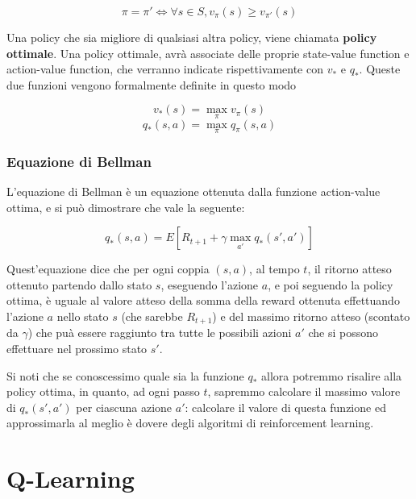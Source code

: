 \documentclass[a4paper,11pt,twoside]{report} %
\begin{document}
\begin{equation}
\pi = \pi ' \iff  \forall s \in S, v_{\pi}(s) \ge v_{\pi '}(s)
\end{equation}

Una policy che sia migliore di qualsiasi altra policy, viene chiamata \textbf{policy ottimale}. Una policy ottimale, avrà associate delle proprie state-value function e action-value function, che verranno indicate rispettivamente con $v_{*}$ e $q_{*}$. Queste due funzioni vengono formalmente definite in questo modo

\begin{equation}
	v_{*}(s) = \max_{\pi} v_{\pi}(s)
\end{equation}
\begin{equation}
q_{*}(s,a) = \max_{\pi} q_{\pi}(s,a)
\end{equation}

\subsection{Equazione di Bellman}

L'equazione di Bellman è un equazione ottenuta dalla funzione action-value ottima, e si può dimostrare che vale la seguente:

\begin{equation}
	q_{*}(s,a)=E[R_{t+1}+\gamma \max_{a'}q_{*}(s',a')]
\end{equation}

Quest'equazione dice che per ogni coppia $(s,a)$, al tempo $t$, il ritorno atteso ottenuto partendo dallo stato $s$, eseguendo l'azione $a$, e poi seguendo la policy ottima, è uguale al valore atteso della somma della reward ottenuta effettuando l'azione $a$ nello stato $s$ (che sarebbe $R_{t+1}$) e del massimo ritorno atteso (scontato da $\gamma$) che puà essere raggiunto tra tutte le possibili azioni $a'$ che si possono effettuare nel prossimo stato $s'$.

Si noti che se conoscessimo quale sia la funzione $q_{*}$ allora potremmo risalire alla policy ottima, in quanto, ad ogni passo $t$, sapremmo calcolare il massimo valore di $q_{*}(s',a')$ per ciascuna azione $a'$: calcolare il valore di questa funzione ed approssimarla al meglio è dovere degli algoritmi di reinforcement learning.

\chapter{Q-Learning}
\end{document}
